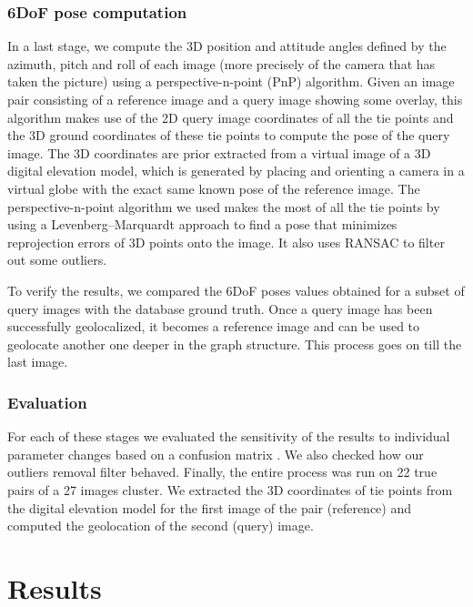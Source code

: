 \documentclass[fleqn,10pt]{wlpeerj} %
\begin{document}
\subsubsection*{6DoF pose computation}
In a last stage, 
we compute the 3D position and attitude angles defined by the azimuth, pitch
and roll of each image (more precisely of the camera that has taken the 
picture) using a perspective-n-point (PnP) algorithm. Given an image pair consisting
of a reference image and a query image showing some overlay, this algorithm makes 
use of the 2D query image coordinates of all the tie points and the 3D ground 
coordinates of these tie points to compute the pose of the query image. 
The 3D coordinates are prior extracted from a virtual image of a 3D digital 
elevation model, which is generated by placing and orienting a camera in
a virtual globe with the exact same known pose of the reference image.
The perspective-n-point algorithm we used makes the most of all the tie points
by using a Levenberg–Marquardt approach to find a pose that minimizes reprojection 
errors of 3D points onto the image. It also uses RANSAC to filter out some outliers.

To verify the results, we compared the 6DoF poses values obtained for a subset 
of query images with the database ground truth. Once a query image has been
successfully geolocalized, it becomes a reference image and can be used to geolocate
another one deeper in the graph structure. This process goes on till the last image.


\subsubsection*{Evaluation}
For each of these stages we evaluated the sensitivity of the results to individual
parameter changes based on a confusion matrix \citep{stehman1997}.
We also checked how our outliers removal filter behaved.
Finally, the entire process was run on 22 true pairs of a 27 images cluster. 
We extracted the 3D coordinates of tie points from the digital elevation model
for the first image of the pair (reference) and computed the geolocation of 
the second (query) image.



\section*{Results}
\end{document}

